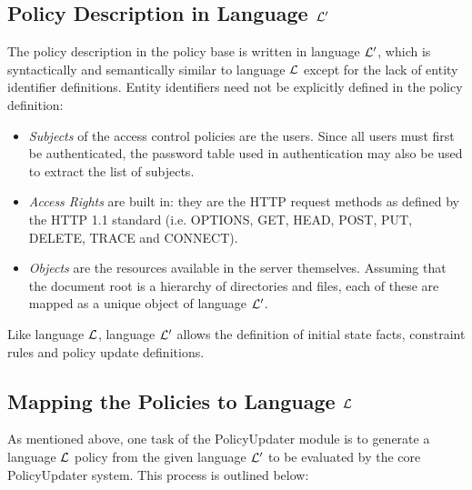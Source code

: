 \documentclass[global,twocolumn,final]{svjour}
\begin{document}
    \subsection{Policy Description in Language ${\cal L'}$}

      The policy description in the policy base is written in language
      ${\cal L'}$, which is syntactically and semantically similar to
      language ${\cal L}$ except for the lack of entity identifier
      definitions. Entity identifiers need not be explicitly defined in
      the policy definition:

      \begin{itemize}
        \item
          {\em Subjects} of the access control policies are the users. Since
          all users must first be authenticated, the password table used
          in authentication may also be used to extract the list of subjects.
        \item
          {\em Access Rights} are built in: they are the HTTP request methods
          as defined by the HTTP 1.1 standard \cite{HTTP1} (i.e. OPTIONS, GET,
          HEAD, POST, PUT, DELETE, TRACE and CONNECT).
        \item
          {\em Objects} are the resources available in the server themselves.
          Assuming that the document root is a hierarchy of directories and
          files, each of these are mapped as a unique object of language
          ${\cal L'}$.
      \end{itemize}

      Like language ${\cal L}$, language ${\cal L'}$ allows the definition of
      initial state facts, constraint rules and policy update definitions.

    \subsection{Mapping the Policies to Language ${\cal L}$}

      As mentioned above, one task of the PolicyUpdater module is to generate
      a language ${\cal L}$ policy from the given language ${\cal L'}$ to be
      evaluated by the core PolicyUpdater system. This process is outlined
      below:
\end{document}
